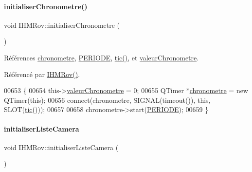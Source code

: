 \paragraph{\texorpdfstring{initialiser\+Chronometre()}{initialiserChronometre()}}
{\footnotesize\ttfamily void I\+H\+M\+Rov\+::initialiser\+Chronometre (\begin{DoxyParamCaption}{ }\end{DoxyParamCaption})\hspace{0.3cm}{\ttfamily [private]}}



Références \hyperlink{class_i_h_m_rov_ac8733c564d7beea8b669e62544a006a5}{chronometre}, \hyperlink{ihmrov_8h_ad0750d12e2f5f404ec458d4066a53fa4}{P\+E\+R\+I\+O\+DE}, \hyperlink{class_i_h_m_rov_a4a0d3a0741d0669ede732b630eae54c6}{tic()}, et \hyperlink{class_i_h_m_rov_a38ad5c20c2347825c237e9b85bb5c7e6}{valeur\+Chronometre}.



Référencé par \hyperlink{class_i_h_m_rov_a5dac1fb4612866cc61f699a415e0ef6b}{I\+H\+M\+Rov()}.


\begin{DoxyCode}
00653 \{
00654     this->\hyperlink{class_i_h_m_rov_a38ad5c20c2347825c237e9b85bb5c7e6}{valeurChronometre} = 0;
00655     QTimer *\hyperlink{class_i_h_m_rov_ac8733c564d7beea8b669e62544a006a5}{chronometre} = \textcolor{keyword}{new} QTimer(\textcolor{keyword}{this});
00656     connect(chronometre, SIGNAL(timeout()), \textcolor{keyword}{this}, SLOT(\hyperlink{class_i_h_m_rov_a4a0d3a0741d0669ede732b630eae54c6}{tic}()));
00657 
00658     chronometre->start(\hyperlink{ihmrov_8h_ad0750d12e2f5f404ec458d4066a53fa4}{PERIODE});
00659 \}
\end{DoxyCode}
\mbox{\label{class_i_h_m_rov_af3e46f174ab2fdeaebb2d00e6b8bcb33}} 
\paragraph{\texorpdfstring{initialiser\+Liste\+Camera}{initialiserListeCamera}}
{\footnotesize\ttfamily void I\+H\+M\+Rov\+::initialiser\+Liste\+Camera (\begin{DoxyParamCaption}{ }\end{DoxyParamCaption})\hspace{0.3cm}{\ttfamily [slot]}}



